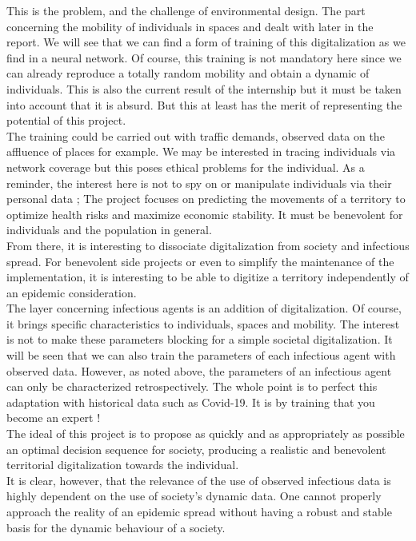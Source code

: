 This is the problem, and the challenge of environmental design. The part concerning the mobility of individuals in spaces and dealt with later in the report. We will see that we can find a form of training of this digitalization as we find in a neural network. Of course, this training is not mandatory here since we can already reproduce a totally random mobility and obtain a dynamic of individuals. This is also the current result of the internship but it must be taken into account that it is absurd. But this at least has the merit of representing the potential of this project.\\

The training could be carried out with traffic demands, observed data on the affluence of places for example. We may be interested in tracing individuals via network coverage but this poses ethical problems for the individual. As a reminder, the interest here is not to spy on or manipulate individuals via their personal data ; The project focuses on predicting the movements of a territory to optimize health risks and maximize economic stability. It must be benevolent for individuals and the population in general.\\

From there, it is interesting to dissociate digitalization from society and infectious spread. For benevolent side projects or even to simplify the maintenance of the implementation, it is interesting to be able to digitize a territory independently of an epidemic consideration.\\

The layer concerning infectious agents is an addition of digitalization. Of course, it brings specific characteristics to individuals, spaces and mobility. The interest is not to make these parameters blocking for a simple societal digitalization. It will be seen that we can also train the parameters of each infectious agent with observed data. However, as noted above, the parameters of an infectious agent can only be characterized retrospectively. The whole point is to perfect this adaptation with historical data such as Covid-19. It is by training that you become an expert !\\

The ideal of this project is to propose as quickly and as appropriately as possible an optimal decision sequence for society, producing a realistic and benevolent territorial digitalization towards the individual.\\

It is clear, however, that the relevance of the use of observed infectious data is highly dependent on the use of society's dynamic data. One cannot properly approach the reality of an epidemic spread without having a robust and stable basis for the dynamic behaviour of a society.\\


